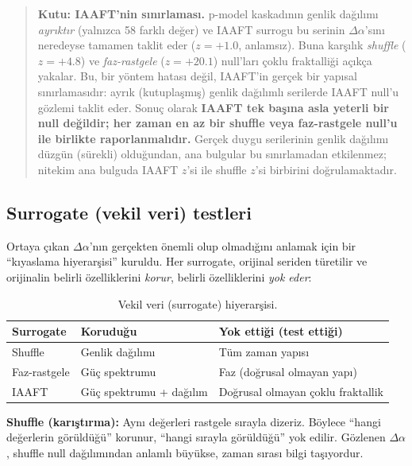 \documentclass[11pt,a4paper]{article}
\newcommand{\Dal}{\Delta\alpha}
\begin{document}
\begin{quote}
\small
\textbf{Kutu: IAAFT'nin sınırlaması.} p-model kaskadının genlik dağılımı
\emph{ayrıktır} (yalnızca 58 farklı değer) ve IAAFT surrogu bu serinin $\Dal$'sını
neredeyse tamamen taklit eder ($z=+1.0$, anlamsız). Buna karşılık \emph{shuffle}
($z=+4.8$) ve \emph{faz-rastgele} ($z=+20.1$) null'ları çoklu fraktalliği açıkça
yakalar. Bu, bir yöntem hatası değil, IAAFT'in gerçek bir yapısal sınırlamasıdır:
ayrık (kutuplaşmış) genlik dağılımlı serilerde IAAFT null'u gözlemi taklit eder.
Sonuç olarak \textbf{IAAFT tek başına asla yeterli bir null değildir; her zaman
en az bir shuffle veya faz-rastgele null'u ile birlikte raporlanmalıdır.}
Gerçek duygu serilerinin genlik dağılımı düzgün (sürekli) olduğundan, ana
bulgular bu sınırlamadan etkilenmez; nitekim ana bulguda IAAFT $z$'si ile
shuffle $z$'si birbirini doğrulamaktadır.
\end{quote}

\subsection{Surrogate (vekil veri) testleri}

Ortaya çıkan $\Dal$'nın gerçekten önemli olup olmadığını anlamak için bir
``kıyaslama hiyerarşisi'' kuruldu. Her surrogate, orijinal seriden türetilir
ve orijinalin belirli özelliklerini \emph{korur}, belirli özelliklerini
\emph{yok eder}:

\begin{table}[H]
\centering
\caption{Vekil veri (surrogate) hiyerarşisi.}
\label{tab:surr}
\begin{tabular}{lll}
\toprule
Surrogate & Koruduğu & Yok ettiği (test ettiği)\\
\midrule
Shuffle & Genlik dağılımı & Tüm zaman yapısı\\
Faz-rastgele & Güç spektrumu & Faz (doğrusal olmayan yapı)\\
IAAFT & Güç spektrumu + dağılım & Doğrusal olmayan çoklu fraktallik\\
\bottomrule
\end{tabular}
\end{table}

\textbf{Shuffle (karıştırma):} Aynı değerleri rastgele sırayla dizeriz. Böylece
``hangi değerlerin görüldüğü'' korunur, ``hangi sırayla görüldüğü'' yok edilir.
Gözlenen $\Dal$, shuffle null dağılımından anlamlı büyükse, zaman sırası
bilgi taşıyordur.
\end{document}
